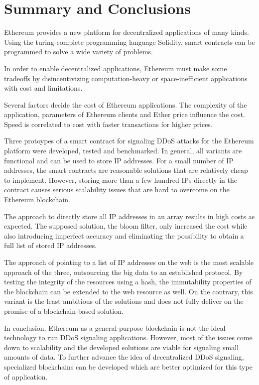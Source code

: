 \chapter{Summary and Conclusions}

Ethereum provides a new platform for decentralized applications of many kinds. Using the turing-complete programming language Solidity, smart contracts can be programmed to solve a wide variety of problems.

In order to enable decentralized applications, Ethereum must make some tradeoffs by disincentivizing computation-heavy or space-inefficient applications with cost and limitations.

Several factors decide the cost of Ethereum applications. The complexity of the application, parameters of Ethereum clients and Ether price influence the cost. Speed is correlated to cost with faster transactions for higher prices.

Three protoypes of a smart contract for signaling DDoS attacks for the Ethereum platform were developed, tested and benchmarked. In general, all variants are functional and can be used to store IP addresses. For a small number of IP addresses, the smart contracts are reasonable solutions that are relatively cheap to implement. However, storing more than a few hundred IPs directly in the contract causes serious scalability issues that are hard to overcome on the Ethereum blockchain.

The approach to directly store all IP addresses in an array results in high costs as expected. The supposed solution, the bloom filter, only increased the cost while also introducing imperfect accuracy and eliminating the possibility to obtain a full list of stored IP addresses.

The approach of pointing to a list of IP addresses on the web is the most scalable approach of the three, outsourcing the big data to an established protocol. By testing the integrity of the resources using a hash, the immutability properties of the blockchain can be extended to the web resource as well. On the contrary, this variant is the least ambitious of the solutions and does not fully deliver on the promise of a blockchain-based solution.

In conclusion, Ethereum as a general-purpose blockchain is not the ideal technology to run DDoS signaling applications. However, most of the issues come down to scalability and the developed solutions are viable for signaling small amounts of data. To further advance the idea of decentralized DDoS signaling, specialized blockchains can be developed which are better optimized for this type of application.

